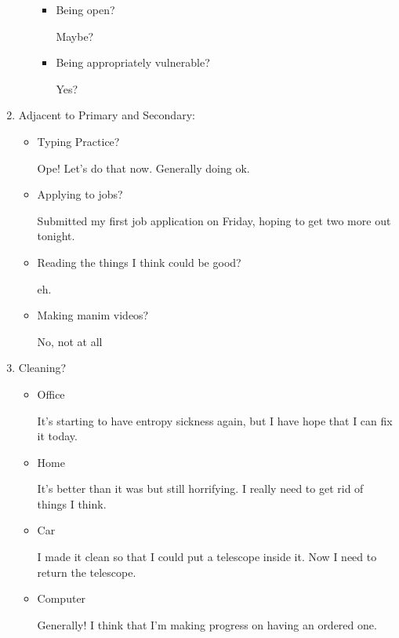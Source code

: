 \documentclass[12pt]{article}
\renewcommand{\,}{\textsuperscript{,}}
\begin{document}
\begin{enumerate}
\begin{itemize}
\begin{itemize}
\item Being open?

Maybe?

\item Being appropriately vulnerable?

Yes?

\end{itemize}

\end{itemize}

\item Adjacent to Primary and Secondary:

\begin{itemize}

\item Typing Practice?

Ope! Let's do that now. Generally doing ok.

\item Applying to jobs?

Submitted my first job application on Friday, hoping to get two more out tonight.

\item Reading the things I think could be good?

eh.

\item Making manim videos?

No, not at all

\end{itemize}

\item Cleaning?

\begin{itemize}

\item Office

It's starting to have entropy sickness again, but I have hope that I can fix it today.

\item Home

It's better than it was but still horrifying. I really need to get rid of things I think.

\item Car

I made it clean so that I could put a telescope inside it.  
Now I need to return the telescope.

\item Computer

Generally! I think that I'm making progress on having an ordered one.


\end{itemize}
\end{enumerate}
\end{document}
